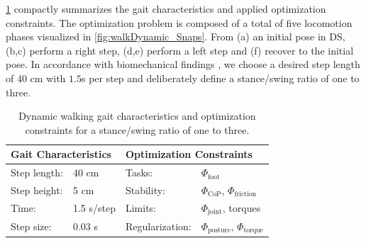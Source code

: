 \cref{tab:walkDynamic} compactly summarizes the gait characteristics and applied optimization constraints. The optimization problem is composed of a total of five locomotion phases visualized in \cref{fig:walkDynamic_Snaps}. From (a) an initial pose in \gls{DS}, (b,c) perform a right step, (d,e) perform a left step and (f) recover to the initial pose. In accordance with biomechanical findings \cite{kuo2001simple}, we choose a desired step length of 40 cm with $1.5$s per step and deliberately define a stance/swing ratio of one to three.

\begin{table}[t]
\centering
\caption[Dynamic walking gait characteristics and optimization constraints]{Dynamic walking gait characteristics and optimization constraints for a stance/swing ratio of one to three.}
\begin{tabular}{|ll|ll|}
\hline
\multicolumn{2}{|l|}{\textbf{Gait Characteristics}} & \multicolumn{2}{l|}{\textbf{Optimization Constraints}} \\ \hline
Step length:& 40 cm 	& Tasks: 			& $\Phi_{\text{foot}}$\\ \hline
Step height:& 5 cm 	& Stability: 		&$\Phi_{\text{CoP}}$, $\Phi_{\text{friction}}$ \\ \hline
Time:& 1.5 s/step	& Limits: 			& $\Phi_{\text{joint}}$, torques \\ \hline
Step size:& 0.03 s	& Regularization: 	& $\Phi_{\text{posture}}$, $\Phi_{\text{torque}}$\\ \hline
\end{tabular}
\label{tab:walkDynamic}
\end{table} 

